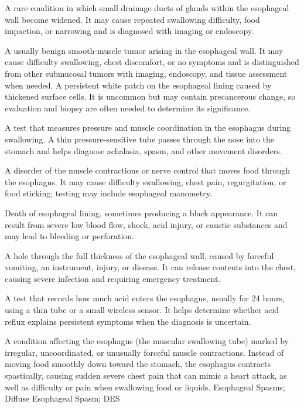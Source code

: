  A rare condition in which small drainage ducts of glands within the esophageal wall become widened. It may cause repeated swallowing difficulty, food impaction, or narrowing and is diagnosed with imaging or endoscopy.

 A usually benign smooth-muscle tumor arising in the esophageal wall. It may cause difficulty swallowing, chest discomfort, or no symptoms and is distinguished from other submucosal tumors with imaging, endoscopy, and tissue assessment when needed.
 A persistent white patch on the esophageal lining caused by thickened surface cells. It is uncommon but may contain precancerous change, so evaluation and biopsy are often needed to determine its significance.

 A test that measures pressure and muscle coordination in the esophagus during swallowing. A thin pressure-sensitive tube passes through the nose into the stomach and helps diagnose achalasia, spasm, and other movement disorders.

 A disorder of the muscle contractions or nerve control that moves food through the esophagus. It may cause difficulty swallowing, chest pain, regurgitation, or food sticking; testing may include esophageal manometry.

 Death of esophageal lining, sometimes producing a black appearance. It can result from severe low blood flow, shock, acid injury, or caustic substances and may lead to bleeding or perforation.

 A hole through the full thickness of the esophageal wall, caused by forceful vomiting, an instrument, injury, or disease. It can release contents into the chest, causing severe infection and requiring emergency treatment.

 A test that records how much acid enters the esophagus, usually for 24 hours, using a thin tube or a small wireless sensor. It helps determine whether acid reflux explains persistent symptoms when the diagnosis is uncertain.

 A condition affecting the esophagus (the muscular swallowing tube) marked by irregular, uncoordinated, or unusually forceful muscle contractions. Instead of moving food smoothly down toward the stomach, the esophagus contracts spastically, causing sudden severe chest pain that can mimic a heart attack, as well as difficulty or pain when swallowing food or liquids.
\synonyms
Esophageal Spasms; Diffuse Esophageal Spasm; DES

